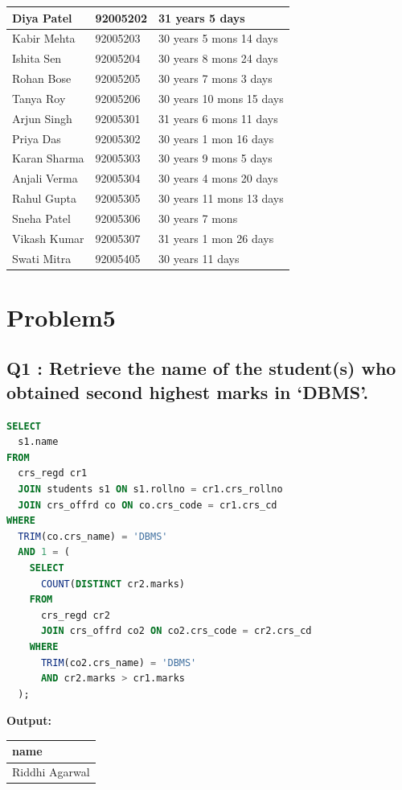 \documentclass[11pt, a4paper]{article}
\begin{document}
\begin{center}
\begin{tabular}{|l|l|l|}
Diya Patel                     & 92005202 & 31 years 5 days \\ \hline
Kabir Mehta                    & 92005203 & 30 years 5 mons 14 days \\ \hline
Ishita Sen                     & 92005204 & 30 years 8 mons 24 days \\ \hline
Rohan Bose                     & 92005205 & 30 years 7 mons 3 days \\ \hline
Tanya Roy                      & 92005206 & 30 years 10 mons 15 days \\ \hline
Arjun Singh                    & 92005301 & 31 years 6 mons 11 days \\ \hline
Priya Das                      & 92005302 & 30 years 1 mon 16 days \\ \hline
Karan Sharma                   & 92005303 & 30 years 9 mons 5 days \\ \hline
Anjali Verma                   & 92005304 & 30 years 4 mons 20 days \\ \hline
Rahul Gupta                    & 92005305 & 30 years 11 mons 13 days \\ \hline
Sneha Patel                    & 92005306 & 30 years 7 mons \\ \hline
Vikash Kumar                   & 92005307 & 31 years 1 mon 26 days \\ \hline
Swati Mitra                    & 92005405 & 30 years 11 days \\ \hline
\end{tabular}
\end{center}
\newpage
\section{Problem5}
\subsection*{Q1 : Retrieve the name of the student(s) who obtained second highest marks in ‘DBMS’.}
\begin{lstlisting}[language=SQL]
SELECT
  s1.name
FROM
  crs_regd cr1
  JOIN students s1 ON s1.rollno = cr1.crs_rollno
  JOIN crs_offrd co ON co.crs_code = cr1.crs_cd
WHERE
  TRIM(co.crs_name) = 'DBMS'
  AND 1 = (
    SELECT
      COUNT(DISTINCT cr2.marks)
    FROM
      crs_regd cr2
      JOIN crs_offrd co2 ON co2.crs_code = cr2.crs_cd
    WHERE
      TRIM(co2.crs_name) = 'DBMS'
      AND cr2.marks > cr1.marks
  );
\end{lstlisting}
\vspace{0.3cm}
\textbf{Output:}\vspace{0.2cm}
\begin{center}
\begin{tabular}{|l|}
\hline
\textbf{name} \\ \hline
Riddhi Agarwal                 \\ \hline
\end{tabular}
\end{center}
\newpage
\end{document}
